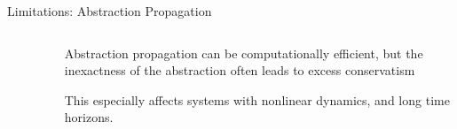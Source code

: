 \begin{frame}[fragile]{Limitations: Abstraction Propagation}
\begin{columns}
\begin{column}{0.4\textwidth}
\begin{figure}
{
                }
            \end{figure}
        \end{column}
        \begin{column}{0.6\textwidth}
            Abstraction propagation can be computationally efficient, but the inexactness of the abstraction often leads to excess conservatism
            
            \vspace{0.5cm}

            This especially affects systems with nonlinear dynamics, and long time horizons.
        \end{column}
    \end{columns}
\end{frame}

